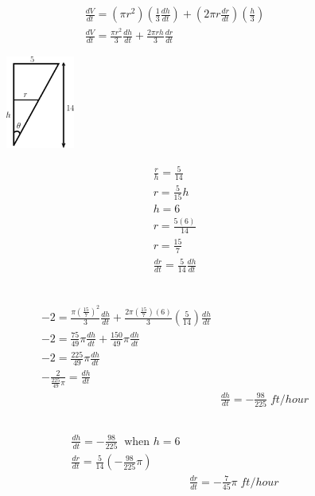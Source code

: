 \documentclass[16pt letter]{article}
\begin{document}
\begin{align*}
	\frac{dV}{dt} = (\pi r^2)(\frac{1}{3}\frac{dh}{dt}) + (2 \pi r \frac{dr}{dt})(\frac{h}{3}) \\
	\frac{dV}{dt} = \frac{\pi r^2}{3} \frac{dh}{dt} + \frac{2 \pi rh}{3}\frac{dr}{dt}
\end{align*}

\begin{figure}[h]
	\centering
	\includegraphics[width=0.20\textwidth]{Application Q6 B}
\end{figure}
\begin{align*}
	\frac{r}{h} = \frac{5}{14}                 \\
	r = \frac{5}{15}h                          \\[10pt]
	h = 6                                      \\
	r = \frac{5(6)}{14}                        \\
	r = \frac{15}{7}                           \\[20pt]
	\frac{dr}{dt} = \frac{5}{14} \frac{dh}{dt} \\
\end{align*}
\subsection{}
\begin{align*}
	-2 = \frac{\pi (\frac{15}{7})^2}{3}\frac{dh}{dt} + \frac{2 \pi (\frac{15}{7})(6)}{3}(\frac{5}{14})\frac{dh}{dt} \\
	-2 = \frac{75}{49}\pi \frac{dh}{dt} + \frac{150}{49}\pi \frac{dh}{dt}                                           \\
	-2 = \frac{225}{49}\pi \frac{dh}{dt}                                                                            \\
	- \frac{2}{\frac{225}{49}\pi} = \frac{dh}{dt}                                                                   \\
	 & \frac{dh}{dt} = -\frac{98}{225}\;ft/hour
\end{align*}

\subsection{}
\begin{align*}
	\frac{dh}{dt} = -\frac{98}{225} \;\; \text{when } h = 6 \\
	\frac{dr}{dt} = \frac{5}{14}(-\frac{98}{225}\pi )       \\
	 & \frac{dr}{dt} = -\frac{7}{45}\pi\; ft/hour
\end{align*}
\pagebreak
\end{document}
